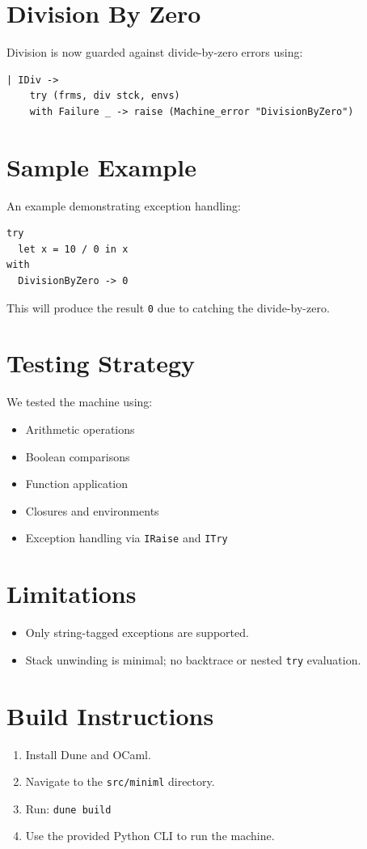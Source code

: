 \documentclass[11pt]{article}
\begin{document}
\section{Division By Zero}
Division is now guarded against divide-by-zero errors using:
\begin{lstlisting}
| IDiv -> 
    try (frms, div stck, envs)
    with Failure _ -> raise (Machine_error "DivisionByZero")
\end{lstlisting}

\section{Sample Example}
An example demonstrating exception handling:
\begin{lstlisting}
try
  let x = 10 / 0 in x
with
  DivisionByZero -> 0
\end{lstlisting}

This will produce the result \texttt{0} due to catching the divide-by-zero.

\section{Testing Strategy}
We tested the machine using:
\begin{itemize}
    \item Arithmetic operations
    \item Boolean comparisons
    \item Function application
    \item Closures and environments
    \item Exception handling via \texttt{IRaise} and \texttt{ITry}
\end{itemize}

\section{Limitations}
\begin{itemize}
    \item Only string-tagged exceptions are supported.
    \item Stack unwinding is minimal; no backtrace or nested \texttt{try} evaluation.
\end{itemize}

\section{Build Instructions}
\begin{enumerate}
    \item Install Dune and OCaml.
    \item Navigate to the \texttt{src/miniml} directory.
    \item Run: \texttt{dune build}
    \item Use the provided Python CLI to run the machine.
\end{enumerate}
\end{document}

